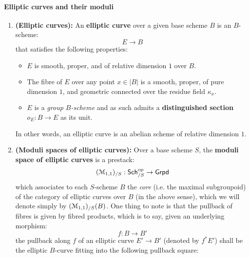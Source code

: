                \paragraph{Elliptic curves and their moduli}
                    \begin{definition} \label{def: moduli_of_elliptic_curves} 
                        \noindent
                        \begin{enumerate}
                            \item \textbf{(Elliptic curves):} An \textbf{elliptic curve} over a given base scheme $B$ is an $B$-scheme:
                                $$E \to B$$
                            that satisfies the following properties:
                                \begin{itemize}
                                    \item $E$ is smooth, proper, and of relative dimension $1$ over $B$.
                                    \item The fibre of $E$ over any point $x \in |B|$ is a smooth, proper, of pure dimension $1$, and geometric connected over the residue field $\kappa_x$.
                                    \item $E$ is a \textit{group $B$-scheme} and as such admits a \textbf{distinguished section} $o_E: B \to E$ as its unit.
                                \end{itemize}
                            In other words, an elliptic curve is an abelian scheme of relative dimension $1$.
                            \item \textbf{(Moduli spaces of elliptic curves):} Over a base scheme $S$, the \textbf{moduli space of elliptic curves} is a prestack:
                                $$(\calM_{1, 1})_{/S}: \Sch_{/S}^{\op} \to \Grpd$$
                            which associates to each $S$-scheme $B$ the \textit{core} (i.e. the maximal subgroupoid) of the category of elliptic curves over $B$ (in the above sense), which we will denote simply by $(\calM_{1, 1})_{/S}(B)$. One thing to note is that the pullback of fibres is given by fibred products, which is to say, given an underlying morphism:
                                $$f: B \to B'$$
                            the pullback along $f$ of an elliptic curve $E' \to B'$ (denoted by $f^*E'$) shall be the elliptic $B$-curve fitting into the following pullback square:
                                $$
                                    \begin{tikzcd}

\end{tikzcd}$$
\end{enumerate}
\end{definition}
